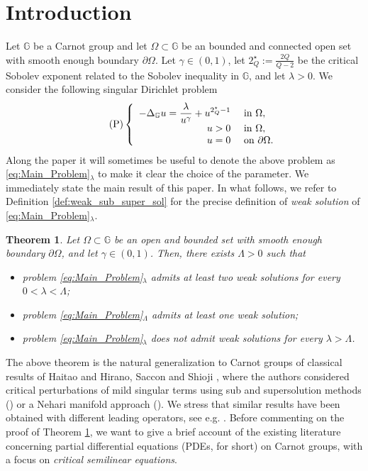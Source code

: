 \documentclass[11pt]{amsart}
\numberwithin{equation}{section} %
\newtheorem{teo}{Theorem}[section]
\theoremstyle{definition}
\begin{document}
\section{Introduction}
Let $\mathbb{G}$ be a Carnot group and let $\Omega \subset \mathbb{G}$ be an bounded and connected
open set with smooth enough boundary $\partial \Omega$. Let $\gamma \in (0,1)$, let $2^{\star}_{Q}:=\tfrac{2Q}{Q-2}$ be the critical Sobolev exponent related to the Sobolev inequality in $\mathbb{G}$, and let $\lambda >0$. We consider the following singular Dirichlet problem
\begin{equation}\tag{{$\mathrm{P}$}}\label{eq:Main_Problem}
	\left\{\begin{array}{rl}
		-\Delta_{\mathbb{G}}u = \dfrac{\lambda}{u^{\gamma}} + u^{2^{\star}_{Q}-1} & \textrm{ in } \Omega,\\
		u>0 & \textrm{ in } \Omega,\\
		u=0 & \textrm{ on } \partial \Omega.
	\end{array}\right.
\end{equation}
Along the paper it will sometimes be useful to denote the above problem as \eqref{eq:Main_Problem}$_\lambda$ 
to make it clear the choice of the parameter.
We immediately state the main result of this paper. In what follows,
we refer to Definition \ref{def:weak_sub_super_sol} for the precise definition of \emph{weak solution}
of \eqref{eq:Main_Problem}$_{\lambda}$.
\begin{teo} \label{thm:main}
	Let $\Omega\subset\mathbb{G}$ be an open and bounded set
	with smooth enough boundary $\partial \Omega$, and let $\gamma\in (0,1)$. Then, there exists $\Lambda > 0$
	such that
	\begin{itemize}
		\item[a)] problem \eqref{eq:Main_Problem}$_{\lambda}$ admits at least two weak solutions
		for every $0<\lambda<\Lambda$;
		\item[b)]  problem \eqref{eq:Main_Problem}$_{\Lambda}$ admits at least one weak solution;
		\item[c)]
		problem \eqref{eq:Main_Problem}$_{\lambda}$ does not admit weak solutions
		for every $\lambda>\Lambda$.
	\end{itemize}
\end{teo}

The above theorem is the natural generalization to Carnot groups of classical results of Haitao \cite{Haitao} and Hirano, Saccon and Shioji \cite{Hirano}, where the authors considered critical perturbations of mild singular terms using sub and supersolution methods (\cite{Haitao}) or a Nehari manifold approach (\cite{Hirano}). We stress that similar results have been obtained with different leading operators, see e.g. \cite{GiacMukSre, KRS, BV}.
Before commenting on the proof of Theorem \ref{thm:main}, we want to give a brief account of the existing literature concerning partial differential equations (PDEs, for short) on Carnot groups,
with a focus on \emph{critical semilinear equations}. 
\vspace{0.1cm}
\end{document}
